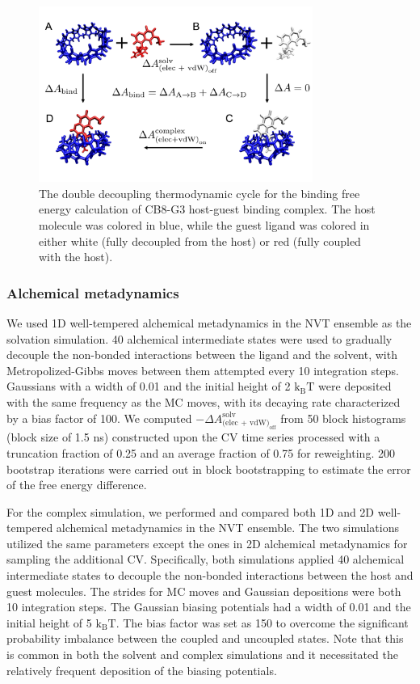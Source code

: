 \documentclass[journal=jacsat,manuscript=article]{achemso}
\begin{document}
\begin{figure}[ht]
    \centering
    \includegraphics[width=0.8\textwidth]{Figures/cycle_final.png} 
    \caption{The double decoupling thermodynamic cycle for the binding free energy calculation of CB8-G3 host-guest binding complex. The host molecule was colored in blue, while the guest ligand was colored in either white (fully decoupled from the host) or red (fully coupled with the host).}
    \label{thermo_cycle}
\end{figure}

\subsubsection{Alchemical metadynamics}
We used 1D well-tempered alchemical metadynamics in the NVT ensemble as the solvation simulation. 40 alchemical intermediate states were used to gradually decouple the non-bonded interactions between the ligand and the solvent, with Metropolized-Gibbs moves between them attempted every 10 integration steps. Gaussians with a width of 0.01 and the initial height of 2 $\text{k}_{\text{B}}\text{T}$ were deposited with the same frequency as the MC moves, with its decaying rate characterized by a bias factor of 100. We computed $-\Delta A^{\text{solv}}_{\text{(elec + vdW)}_{\text{off}}}$ from 50 block histograms (block size of 1.5 ns) constructed upon the CV time series processed with a truncation fraction of 0.25 and an average fraction of 0.75 for reweighting. 200 bootstrap iterations were carried out in block bootstrapping to estimate the error of the free energy difference. 

For the complex simulation, we performed and compared both 1D and 2D well-tempered alchemical metadynamics in the NVT ensemble. The two simulations utilized the same parameters except the ones in 2D alchemical metadynamics for sampling the additional CV. Specifically, both simulations applied 40 alchemical intermediate states to decouple the non-bonded interactions between the host and guest molecules. The strides for MC moves and Gaussian depositions were both 10 integration steps. The Gaussian biasing potentials had a width of 0.01 and the initial height of 5 $\text{k}_{\text{B}}\text{T}$. The bias factor was set as 150 to overcome the significant probability imbalance between the coupled and uncoupled states. Note that this is common in both the solvent and complex simulations and it necessitated the relatively frequent deposition of the biasing potentials. 
\end{document}

